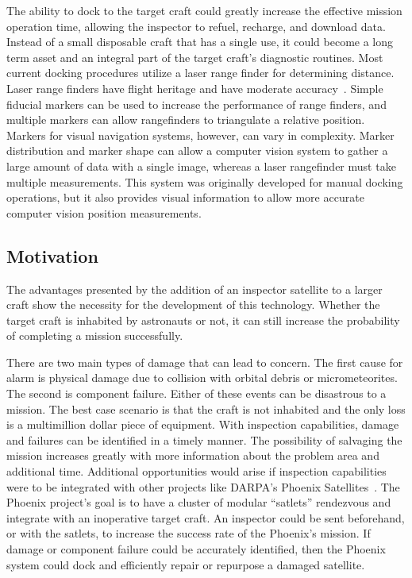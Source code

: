 \documentclass[journal, 10pt]{IEEEtran}
\begin{document}
The ability to dock to the target craft could greatly increase the effective mission operation time, allowing the inspector to refuel, recharge, and download data.  Instead of a small disposable craft that has a single use, it could become a long term asset and an integral part of the target craft's diagnostic routines.  Most current docking procedures utilize a laser range finder for determining distance.  Laser range finders have flight heritage and have moderate accuracy~\cite{Docking}.  Simple fiducial markers can be used to increase the performance of range finders, and multiple markers can allow rangefinders to triangulate a relative position.  Markers for visual navigation systems, however, can vary in complexity.  Marker distribution and marker shape can allow a computer vision system to gather a large amount of data with a single image, whereas a laser rangefinder must take multiple measurements.  This system was originally developed for manual docking operations, but it also provides visual information to allow more accurate computer vision position measurements.

\subsection{Motivation}
The advantages presented by the addition of an inspector satellite to a larger craft show the necessity for the development of this technology.  Whether the target craft is inhabited by astronauts or not, it can still increase the probability of completing a mission successfully.

There are two main types of damage that can lead to concern.  The first cause for alarm is physical damage due to collision with orbital debris or micrometeorites.  The second is component failure.  Either of these events can be disastrous to a mission.  The best case scenario is that the craft is not inhabited and the only loss is a multimillion dollar piece of equipment.  With inspection capabilities, damage and failures can be identified in a timely manner.  The possibility of salvaging the mission increases greatly with more information about the problem area and additional time. Additional opportunities would arise if inspection capabilities were to be integrated with other projects like DARPA's Phoenix Satellites~\cite{Phoenix}.  The Phoenix project's goal is to have a cluster of modular ``satlets'' rendezvous and integrate with an inoperative target craft.  An inspector could be sent beforehand, or with the satlets, to increase the success rate of the Phoenix's mission.  If damage or component failure could be accurately identified, then the Phoenix system could dock and efficiently repair or repurpose a damaged satellite.
\end{document}
